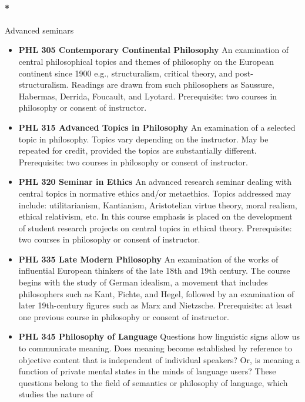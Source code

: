 \documentclass[
  letterpaper,
]{scrbook}
\providecommand{\tightlist}{%
  \setlength{\itemsep}{0pt}\setlength{\parskip}{0pt}}
\let\oldparagraph\paragraph
\renewcommand{\paragraph}[1]{\oldparagraph{#1}\mbox{}}
\begin{document}
\paragraph*{Advanced seminars}\label{advanced-seminars}

\begin{itemize}
\tightlist
\item
  \textbf{PHL 305 Contemporary Continental Philosophy} An examination of
  central philosophical topics and themes of philosophy on the European
  continent since 1900 e.g., structuralism, critical theory, and
  post-structuralism. Readings are drawn from such philosophers as
  Saussure, Habermas, Derrida, Foucault, and Lyotard. Prerequisite: two
  courses in philosophy or consent of instructor.
\item
  \textbf{PHL 315 Advanced Topics in Philosophy} An examination of a
  selected topic in philosophy. Topics vary depending on the instructor.
  May be repeated for credit, provided the topics are substantially
  different. Prerequisite: two courses in philosophy or consent of
  instructor.
\item
  \textbf{PHL 320 Seminar in Ethics} An advanced research seminar
  dealing with central topics in normative ethics and/or metaethics.
  Topics addressed may include: utilitarianism, Kantianism, Aristotelian
  virtue theory, moral realism, ethical relativism, etc. In this course
  emphasis is placed on the development of student research projects on
  central topics in ethical theory. Prerequisite: two courses in
  philosophy or consent of instructor.
\item
  \textbf{PHL 335 Late Modern Philosophy} An examination of the works of
  influential European thinkers of the late 18th and 19th century. The
  course begins with the study of German idealism, a movement that
  includes philosophers such as Kant, Fichte, and Hegel, followed by an
  examination of later 19th-century figures such as Marx and Nietzsche.
  Prerequisite: at least one previous course in philosophy or consent of
  instructor.
\item
  \textbf{PHL 345 Philosophy of Language} Questions how linguistic signs
  allow us to communicate meaning. Does meaning become established by
  reference to objective content that is independent of individual
  speakers? Or, is meaning a function of private mental states in the
  minds of language users? These questions belong to the field of
  semantics or philosophy of language, which studies the nature of

\end{itemize}
\end{document}
